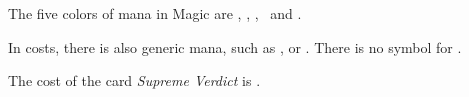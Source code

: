 \documentclass[a4paper]{scrartcl}
\begin{document}
	The five colors of mana in Magic are \mtgwhite, \mtgblue, \mtgblack, \mtgred\ and \mtggreen .

	In costs, there is also generic mana, such as ,  or .
	There is no symbol for .

	The cost of the card \emph{Supreme Verdict} is \mtgwhite\mtgblue .
\end{document}
